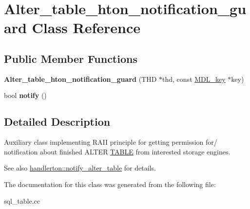 \hypertarget{classAlter__table__hton__notification__guard}{}\section{Alter\+\_\+table\+\_\+hton\+\_\+notification\+\_\+guard Class Reference}
\label{classAlter__table__hton__notification__guard}
\subsection*{Public Member Functions}
\begin{DoxyCompactItemize}
\item 
\mbox{\label{classAlter__table__hton__notification__guard_a4de8c60da5f10cafc6685e7d6d6225d2}} 
{\bfseries Alter\+\_\+table\+\_\+hton\+\_\+notification\+\_\+guard} (T\+HD $\ast$thd, const \mbox{\hyperlink{structMDL__key}{M\+D\+L\+\_\+key}} $\ast$key)
\item 
\mbox{\label{classAlter__table__hton__notification__guard_a4ab98d585ee7edd788c40499465b68ca}} 
bool {\bfseries notify} ()
\end{DoxyCompactItemize}


\subsection{Detailed Description}
Auxiliary class implementing R\+A\+II principle for getting permission for/ notification about finished A\+L\+T\+ER \mbox{\hyperlink{structTABLE}{T\+A\+B\+LE}} from interested storage engines.

\begin{DoxySeeAlso}{See also}
\mbox{\hyperlink{structhandlerton_a57c6461574bf87859428478d916ac1e8}{handlerton\+::notify\+\_\+alter\+\_\+table}} for details. 
\end{DoxySeeAlso}


The documentation for this class was generated from the following file\+:\begin{DoxyCompactItemize}
\item 
sql\+\_\+table.\+cc\end{DoxyCompactItemize}
